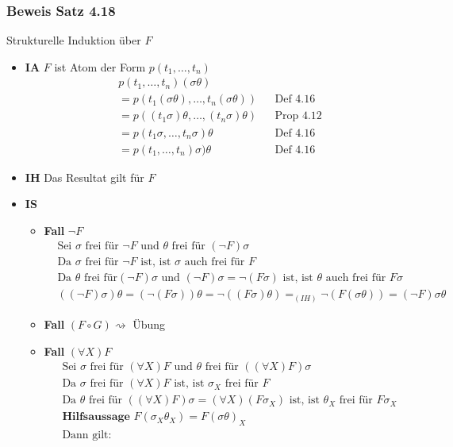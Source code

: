 \subsubsection{Beweis Satz 4.18}
Strukturelle Induktion über \(F\)
\begin{itemize}
	\item \textbf{IA} \(F\) ist Atom der Form \(p(t_{1} , \ldots , t_{n})\)
	\begin{align*}
		&p(t_{1} , \ldots , t_{n} )(\sigma\theta)\\&=p(t_{1}(\sigma\theta) , \ldots , t_{n}(\sigma\theta)) &&\text{Def 4.16}\\ &= p((t_{1}\sigma)\theta , \ldots , (t_{n}\sigma)\theta) &&\text{Prop 4.12}\\ &= p(t_{1}\sigma, \ldots , t_{n}\sigma)\theta &&\text{Def 4.16}\\ &= p(t_{1}, \ldots , t_{n})\sigma)\theta &&\text{Def 4.16}
	\end{align*}
	\item \textbf{IH} Das Resultat gilt für \(F\)
	\item \textbf{IS}
	\begin{itemize}
		\item \textbf{Fall} \(\neg F\)
		\begin{align*}
		&\text{Sei } \sigma \text{ frei für } \neg F \text{ und } \theta \text{ frei für } (\neg F)\sigma \\ &\text{Da } \sigma \text{ frei für } \neg F \text{ ist, ist } \sigma \text{ auch frei für } F \\ &\text{Da } \theta \text{ frei für} (\neg F)\sigma \text{ und } (\neg F)\sigma = \neg (F\sigma) \text{ ist, ist } \theta \text{ auch frei für } F\sigma \\ &((\neg F)\sigma)\theta = (\neg(F\sigma))\theta = \neg ((F\sigma)\theta) =_{(IH)} \neg (F(\sigma\theta)) = (\neg F)\sigma\theta
		\end{align*}
		\item \textbf{Fall} \((F\circ G) \rightsquigarrow \) Übung
		\item \textbf{Fall} \((\forall X)F\)
		\begin{align*}
		&\text{Sei }\sigma \text{ frei für } (\forall X)F \text{ und } \theta \text{ frei für }((\forall X)F)\sigma \\ &\text{Da }\sigma \text{ frei für } (\forall X)F \text{ ist, ist }\sigma_{X} \text{ frei für } F \\&\text{Da }\theta \text{ frei für } ((\forall X)F)\sigma = (\forall X)(F\sigma_{X}) \text{ ist, ist } \theta_{X} \text{ frei für } F\sigma_{X} \\& \textbf{Hilfsaussage } F(\sigma_{X}\theta_{X}) = F(\sigma\theta)_{X} \\&\text{Dann gilt: }

\end{align*}
\end{itemize}
\end{itemize}
